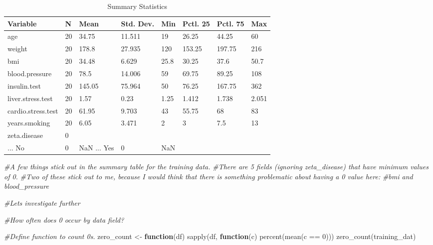 \documentclass[
]{article}
\newenvironment{Shaded}{\begin{snugshade}}{\end{snugshade}}
\newcommand{\CommentTok}[1]{\textcolor[rgb]{0.56,0.35,0.01}{\textit{#1}}}
\newcommand{\ControlFlowTok}[1]{\textcolor[rgb]{0.13,0.29,0.53}{\textbf{#1}}}
\newcommand{\DecValTok}[1]{\textcolor[rgb]{0.00,0.00,0.81}{#1}}
\newcommand{\FunctionTok}[1]{\textcolor[rgb]{0.00,0.00,0.00}{#1}}
\newcommand{\NormalTok}[1]{#1}
\newcommand{\OtherTok}[1]{\textcolor[rgb]{0.56,0.35,0.01}{#1}}
\newcommand{\SpecialCharTok}[1]{\textcolor[rgb]{0.00,0.00,0.00}{#1}}
\begin{document}
\begin{table}

\caption{\label{tab:dataLoad}Summary Statistics}
\centering
\begin{tabular}[t]{llllllll}
\toprule
Variable & N & Mean & Std. Dev. & Min & Pctl. 25 & Pctl. 75 & Max\\
\midrule
age & 20 & 34.75 & 11.511 & 19 & 26.25 & 44.25 & 60\\
weight & 20 & 178.8 & 27.935 & 120 & 153.25 & 197.75 & 216\\
bmi & 20 & 34.48 & 6.629 & 25.8 & 30.25 & 37.6 & 50.7\\
blood.pressure & 20 & 78.5 & 14.006 & 59 & 69.75 & 89.25 & 108\\
insulin.test & 20 & 145.05 & 75.964 & 50 & 76.25 & 167.75 & 362\\
\addlinespace
liver.stress.test & 20 & 1.57 & 0.23 & 1.25 & 1.412 & 1.738 & 2.051\\
cardio.stress.test & 20 & 61.95 & 9.703 & 43 & 55.75 & 68 & 83\\
years.smoking & 20 & 6.05 & 3.471 & 2 & 3 & 7.5 & 13\\
zeta.disease & 0 &  &  &  &  &  & \\
... No & 0 & NaN%
\addlinespace
... Yes & 0 & NaN%
\bottomrule
\end{tabular}
\end{table}

\begin{Shaded}
\begin{Highlighting}[]
\CommentTok{\#A few things stick out in the summary table for the training data. }
\CommentTok{\#There are 5 fields (ignoring zeta\_disease) that have minimum values of 0. }
\CommentTok{\#Two of these stick out to me, because I would think that there is something problematic about having a 0 value here:}
\CommentTok{\#bmi and blood\_pressure}

\CommentTok{\#Let\textquotesingle{}s investigate further}


\CommentTok{\#How often does 0 occur by data field? }

\CommentTok{\#Define function to count 0\textquotesingle{}s. }
\NormalTok{zero\_count }\OtherTok{\textless{}{-}} \ControlFlowTok{function}\NormalTok{(df) }\FunctionTok{sapply}\NormalTok{(df, }\ControlFlowTok{function}\NormalTok{(c) }\FunctionTok{percent}\NormalTok{(}\FunctionTok{mean}\NormalTok{(c }\SpecialCharTok{==} \DecValTok{0}\NormalTok{)))}
\FunctionTok{zero\_count}\NormalTok{(training\_dat)}
\end{Highlighting}
\end{Shaded}
\end{document}
